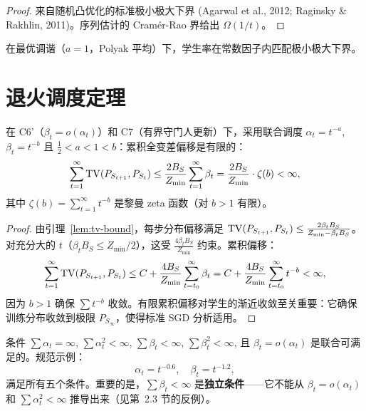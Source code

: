\begin{proof}
来自随机凸优化的标准极小极大下界 (Agarwal et al., 2012; Raginsky \& Rakhlin, 2011)。序列估计的 Cram\'{e}r-Rao 界给出 $\Omega(1/t)$。
\end{proof}

在最优调谐（$a = 1$，Polyak 平均）下，学生率在常数因子内匹配极小极大下界。

\section{退火调度定理}\label{sec:annealing}

\begin{theorem}[退火调度下的有限累积分布偏移]\label{thm:annealing}
在 C6'（$\beta_t = o(\alpha_t)$）和 C7（有界守门人更新）下，采用联合调度 $\alpha_t = t^{-a}$, $\beta_t = t^{-b}$ 且 $\frac{1}{2} < a < 1 < b$：累积全变差偏移是有限的：
\begin{equation}
    \sum_{t=1}^\infty \operatorname{TV}(P_{S_{t+1}}, P_{S_t}) \leq \frac{2 B_S}{Z_{\min}} \sum_{t=1}^\infty \beta_t = \frac{2 B_S}{Z_{\min}} \cdot \zeta(b) < \infty,
\end{equation}
其中 $\zeta(b) = \sum_{t=1}^\infty t^{-b}$ 是黎曼 zeta 函数（对 $b > 1$ 有限）。
\end{theorem}

\begin{proof}
由引理~\ref{lem:tv-bound}，每步分布偏移满足 $\operatorname{TV}(P_{S_{t+1}}, P_{S_t}) \leq \frac{2\beta_t B_S}{Z_{\min} - \beta_t B_S}$。对充分大的 $t$（$\beta_t B_S \leq Z_{\min}/2$），这受 $\frac{4\beta_t B_S}{Z_{\min}}$ 约束。累积偏移：
\begin{equation}
    \sum_{t=1}^\infty \operatorname{TV}(P_{S_{t+1}}, P_{S_t}) \leq C + \frac{4 B_S}{Z_{\min}} \sum_{t=t_0}^\infty \beta_t = C + \frac{4 B_S}{Z_{\min}} \sum_{t=t_0}^\infty t^{-b} < \infty,
\end{equation}
因为 $b > 1$ 确保 $\sum t^{-b}$ 收敛。有限累积偏移对学生的渐近收敛至关重要：它确保训练分布收敛到极限 $P_{S_\infty}$，使得标准 SGD 分析适用。
\end{proof}

\begin{corollary}[联合可满足性]
条件 $\sum \alpha_t = \infty$, $\sum \alpha_t^2 < \infty$, $\sum \beta_t < \infty$, $\sum \beta_t^2 < \infty$, 且 $\beta_t = o(\alpha_t)$ 是联合可满足的。规范示例：
\begin{equation}
    \alpha_t = t^{-0.6}, \quad \beta_t = t^{-1.2},
\end{equation}
满足所有五个条件。重要的是，$\sum \beta_t < \infty$ 是\textbf{独立条件}——它不能从 $\beta_t = o(\alpha_t)$ 和 $\sum \alpha_t^2 < \infty$ 推导出来（见第~2.3 节的反例）。
\end{corollary}

